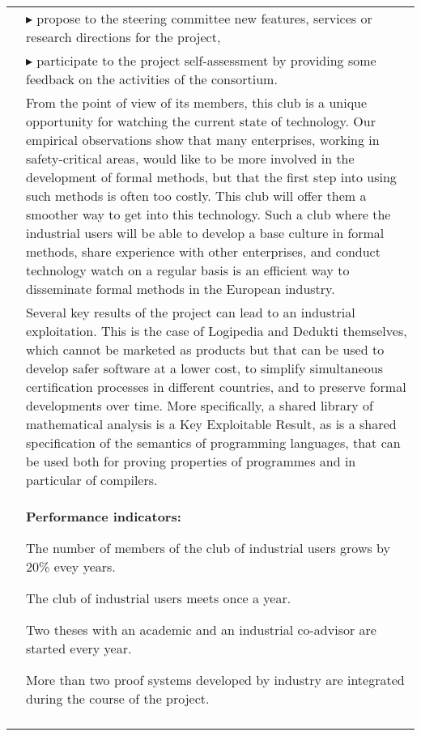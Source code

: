 \begin{longtable}{|p{}|p{}|}
\\
&
$\blacktriangleright$ propose to the steering committee new features,
services or research directions for the project,
\\
&
$\blacktriangleright$ participate to the project self-assessment by providing
some feedback on the activities of the consortium.\\
&
\hspace{0.4cm}
From the point of view of its members, this club is a unique
opportunity for watching the current state of technology. Our empirical observations show that
many enterprises, working in safety-critical areas, would like to be
more involved in the development of formal methods, but that the first
step into using such methods is often too costly. This club will offer
them a smoother way to get into this technology. Such a club
where the industrial users will be able to develop a base culture in
formal methods, share experience with other enterprises, and conduct
technology watch on a regular basis is an efficient way to disseminate
formal methods in the European industry.\\
&
\hspace{0.4cm}
Several key results of the project can lead to an industrial
exploitation. This is the case of Logipedia and Dedukti themselves,
which cannot be marketed as products but that can be used to develop safer
software at a lower cost, to simplify simultaneous certification
processes in different countries, and to preserve formal developments
over time. More specifically, a shared library of mathematical analysis is a Key
Exploitable Result, as is a shared specification of the semantics of
programming languages, that can be used both for proving properties of
programmes and in particular of compilers.\\
&\colorbox{color2}{\bf Performance indicators:}
\begin{compactitem}
\item The number of members of the club of industrial users
  grows by 20\% evey years. 
  \item The club of industrial users meets once a year.
  \item Two theses with an academic and an industrial co-advisor
    are started every year.
  \item More than two proof systems developed by industry are integrated
    during the course of the project.
\end{compactitem}
\\
&


\end{longtable}
